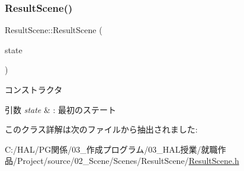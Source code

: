 \subsubsection{\texorpdfstring{Result\+Scene()}{ResultScene()}}
{\footnotesize\ttfamily Result\+Scene\+::\+Result\+Scene (\begin{DoxyParamCaption}\item[{\mbox{\hyperlink{class_scene_base_1_1_state_abstract}{State\+Abstract}} $\ast$}]{state }\end{DoxyParamCaption})\hspace{0.3cm}{\ttfamily [inline]}}



コンストラクタ 


\begin{DoxyParams}{引数}
{\em state} & \+: 最初のステート \\
\hline
\end{DoxyParams}


このクラス詳解は次のファイルから抽出されました\+:\begin{DoxyCompactItemize}
\item 
C\+:/\+H\+A\+L/\+P\+G関係/03\+\_\+作成プログラム/03\+\_\+\+H\+A\+L授業/就職作品/\+Project/source/02\+\_\+\+Scene/\+Scenes/\+Result\+Scene/\mbox{\hyperlink{_result_scene_8h}{Result\+Scene.\+h}}\end{DoxyCompactItemize}
